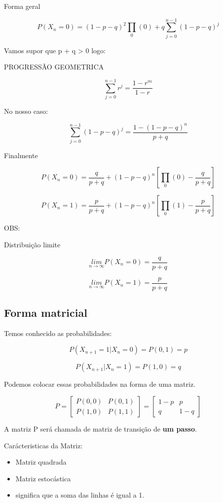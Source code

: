 \documentclass[]{article}
\theoremstyle{definition}
\theoremstyle{definition}
\theoremstyle{definition}
\theoremstyle{remark}
\begin{document}
Forma geral

\[P(X_n=0)=(1-p-q)^2\prod_0(0) + q \sum_{j=0}^{n-1}(1-p-q)^j\]

Vamos supor que p + q \textgreater{} 0 logo:

PROGRESSÃO GEOMETRICA

\[\sum_{j=0}^{n-1} r^j = \frac{1-r^m}{1-r}\]

No nosso caso:

\[\sum_{j=0}^{n-1} (1-p-q)^j = \frac{1-(1-p-q)^n}{p+q}\]

Finalmente

\[P(X_n=0)= \frac{q}{p+q} + (1-p-q)^n[\prod_0(0) - \frac{q}{p+q}]\]

\[P(X_n=1)= \frac{p}{p+q} + (1-p-q)^n[\prod_0(1) - \frac{p}{p+q}]\]

OBS:

Distribuição limite

\[\underset{n \to \infty}{lim} P(X_n=0) = \frac{q}{p+q}\]

\[\underset{n \to \infty}{lim} P(X_n=1) = \frac{p}{p+q}\]

\subsection{Forma matricial}\label{forma-matricial}

Temos conhecido as probabilidades:

\[P(X_{n+1} = 1| X_n = 0) = P(0,1) = p\]

\[P(X_{n+1}|X_n=1) = P(1,0) = q\]

Podemos colocar essas probabilidades na forma de uma matriz.

\begin{equation}

P = \begin{bmatrix}
P(0,0) & P(0,1) \\
P(1,0) & P(1,1)
\end{bmatrix} =
\begin{bmatrix}
1-p & p \\
q & 1-q
\end{bmatrix}

\end{equation}

A matriz P será chamada de matriz de transição de \textbf{um passo}.

Carácteristicas da Matriz:

\begin{itemize}
\item
  Matriz quadrada
\item
  Matriz estocástica
\item
  significa que a soma das linhas é igual a 1.
\end{itemize}
\end{document}
